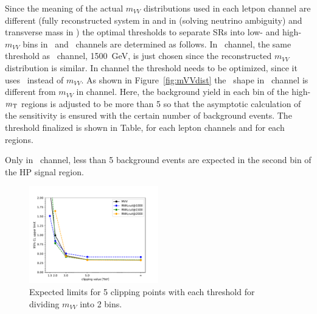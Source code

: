 Since the meaning of the actual $m_{VV}$ distributions used in each letpon channel are different
(fully reconstructed system in \tlep and in \olep (solving neutrino ambiguity) and transverse mass in \zlep)
the optimal thresholds to separate SRs into low- and high-$m_{VV}$ bins in \olep\ and \zlep\ channels 
are determined as follows.
In \olep\ channel, the same threshold as \tlep\ channel, 1500~GeV, is just chosen since the reconstructed $m_{VV}$ distribution is similar. 
In \zlep channel the threshold needs to be optimized, since it uses \mt\ instead of $m_{VV}$.
As shown in Figure~\ref{fig:mVVdist} the \mt\ shape in \zlep\ channel is different from $m_{VV}$ in \tlep channel.
Here, the background yield in each bin of the high-$m_{\mathrm{T}}$ regions is adjusted to be more than 5 so that
the asymptotic calculation of the sensitivity is ensured with the certain number of background events.
The threshold finalized is shown in Table, for each lepton channels and for each regions.

Only in \tlep\ channel,
less than 5 background events are expected in the second bin of the HP signal region.
%
\begin{figure}[h]
        \centering
    	\includegraphics[width=0.50\textwidth]{figures/aQGC/ClippedFT02bin.pdf}
        \caption{Expected limits for 5 clipping points with each threshold for dividing $m_{VV}$ into 2 bins.}
        \label{fig:ThresholdScan}
\end{figure}

